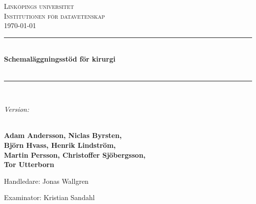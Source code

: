 \begin{titlepage} %
	\newcommand{\HRule}{\rule{\linewidth}{0.5mm}} %

	\center %


	\textsc{\LARGE Linköpings universitet \\ \vspace{0.2em} Institutionen för datavetenskap }\\[2cm]

    \large\today

    \vspace{1cm}



	\HRule\\[0.4cm]

	{\huge\bfseries Schemaläggningsstöd för  kirurgi \vspace{.1em} \\ \ftitle }\\[0.4cm] %

	\HRule\\[1cm]


	\begin{minipage}{0.7\textwidth}
			\large
            \emph{Version: \fversion}
            \vspace{1em}

            \textbf{\\Adam Andersson, Niclas Byrsten, \\Björn Hvass, Henrik Lindström, \\Martin Persson, Christoffer Sjöbergsson, \\Tor Utterborn}


            \vspace{1em}

            Handledare: Jonas Wallgren

            Examinator: Kristian Sandahl
	\end{minipage}
	

\end{titlepage}
